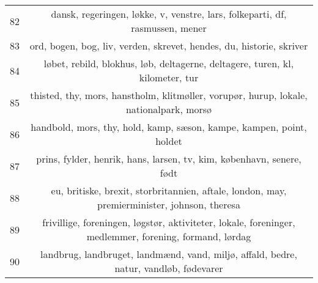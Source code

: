 \begin{longtable}[c]{c | c}
		82 & dansk, regeringen, løkke, v, venstre, lars, folkeparti, df, rasmussen, mener \\
		83 & ord, bogen, bog, liv, verden, skrevet, hendes, du, historie, skriver \\
		84 & løbet, rebild, blokhus, løb, deltagerne, deltagere, turen, kl, kilometer, tur \\
		85 & thisted, thy, mors, hanstholm, klitmøller, vorupør, hurup, lokale, nationalpark, morsø \\
		86 & handbold, mors, thy, hold, kamp, sæson, kampe, kampen, point, holdet \\
		87 & prins, fylder, henrik, hans, larsen, tv, kim, københavn, senere, født \\
		88 & eu, britiske, brexit, storbritannien, aftale, london, may, premierminister, johnson, theresa \\
		89 & frivillige, foreningen, løgstør, aktiviteter, lokale, foreninger, medlemmer, forening, formand, lørdag \\
		90 & landbrug, landbruget, landmænd, vand, miljø, affald, bedre, natur, vandløb, fødevarer \\
\end{longtable}
